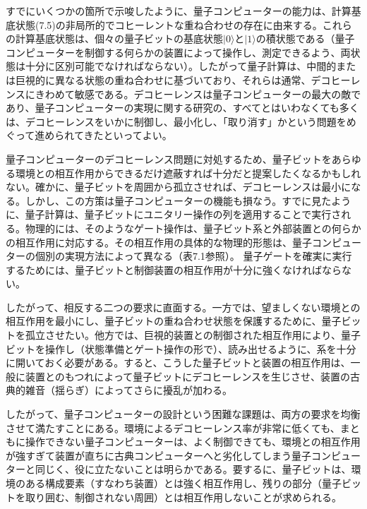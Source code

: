 すでにいくつかの箇所で示唆したように、量子コンピューターの能力は、計算基底状態(7.5)の非局所的でコヒーレントな重ね合わせの存在に由来する。これらの計算基底状態は、個々の量子ビットの基底状態$|0\rangle$と$|1\rangle$の積状態である（量子コンピューターを制御する何らかの装置によって操作し、測定できるよう、両状態は十分に区別可能でなければならない）。したがって量子計算は、中間的または巨視的に異なる状態の重ね合わせに基づいており、それらは通常、デコヒーレンスにきわめて敏感である。デコヒーレンスは量子コンピューターの最大の敵であり、量子コンピューターの実現に関する研究の、すべてとはいわなくても多くは、デコヒーレンスをいかに制御し、最小化し、「取り消す」かという問題をめぐって進められてきたといってよい。

量子コンピューターのデコヒーレンス問題に対処するため、量子ビットをあらゆる環境との相互作用からできるだけ遮蔽すれば十分だと提案したくなるかもしれない。確かに、量子ビットを周囲から孤立させれば、デコヒーレンスは最小になる。しかし、この方策は量子コンピューターの機能も損なう。すでに見たように、量子計算は、量子ビットにユニタリー操作の列を適用することで実行される。物理的には、そのようなゲート操作は、量子ビット系と外部装置との何らかの相互作用に対応する。その相互作用の具体的な物理的形態は、量子コンピューターの個別の実現方法によって異なる（表7.1参照）。
\hypertarget{srcpage:302}{}\label{srcpage:302}
量子ゲートを確実に実行するためには、量子ビットと制御装置の相互作用が十分に強くなければならない。

したがって、相反する二つの要求に直面する。一方では、望ましくない環境との相互作用を最小にし、量子ビットの重ね合わせ状態を保護するために、量子ビットを孤立させたい。他方では、巨視的装置との制御された相互作用により、量子ビットを操作し（状態準備とゲート操作の形で）、読み出せるように、系を十分に開いておく必要がある。すると、こうした量子ビットと装置の相互作用は、一般に装置とのもつれによって量子ビットにデコヒーレンスを生じさせ、装置の古典的雑音（揺らぎ）によってさらに擾乱が加わる。

したがって、量子コンピューターの設計という困難な課題は、両方の要求を均衡させて満たすことにある。環境によるデコヒーレンス率が非常に低くても、まともに操作できない量子コンピューターは、よく制御できても、環境との相互作用が強すぎて装置が直ちに古典コンピューターへと劣化してしまう量子コンピューターと同じく、役に立たないことは明らかである。要するに、量子ビットは、環境のある構成要素（すなわち装置）とは強く相互作用し、残りの部分（量子ビットを取り囲む、制御されない周囲）とは相互作用しないことが求められる。

